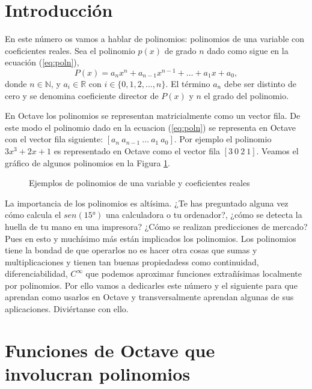 \section*{Introducción}
En este número os vamos a hablar de polinomios: polinomios de una variable con coeficientes reales. Sea el polinomio $p(x)$ de grado $n$ dado como sigue en la ecuación (\ref{eq:poln}),
\begin{equation}\label{eq:poln}
P(x)=a_n x^n + a_{n-1}x^{n-1}+\dots+a_{1}x+a_{0},
\end{equation}
donde $n\in \mathbb{N}$, y $a_i\in\mathbb{R}$ con $i\in \{0,1,2,...,n\}$. El término $a_n$ debe ser distinto de cero y se denomina coeficiente director de $P(x)$ y $n$ el grado del polinomio.

En Octave los polinomios se representan  matricialmente como un vector fila. De este modo el polinomio dado en la ecuacion (\ref{eq:poln}) se representa en Octave con el vector fila siguiente: $[a_n\: a_{n-1}\: \dots \:a_1 \:a_0]$. Por ejemplo el polinomio $3x^3+2x+1$ es representado en Octave como el vector fila $[3\: 0\: 2\: 1]$. Veamos el gráfico de algunos polinomios en la Figura \ref{fig:polis}.
\begin{figure}[ht!]
  \centering
  \begin{figurebox}
  \centering
    \scalebox{0.7}{}
  \caption{Ejemplos de polinomios de una variable y coeficientes reales}
  \label{fig:polis}
  \end{figurebox}
\end{figure}
 
La importancia de los polinomios es altísima. ¿Te has preguntado alguna vez cómo calcula el $sen(15°)$ una calculadora o tu ordenador?, ¿cómo se detecta la huella de tu mano en una impresora? ¿Cómo se realizan predicciones de mercado? Pues en esto y muchísimo más están implicados los polinomios. Los polinomios tiene la bondad de que operarlos no es hacer otra cosas que sumas y multiplicaciones y tienen tan buenas propiedadess como continuidad, diferenciabilidad, $C^\infty$ que podemos aproximar funciones extrañísimas localmente por polinomios. Por ello vamos a dedicarles este número y el siguiente para que aprendan como usarlos en Octave y transversalmente aprendan algunas de sus aplicaciones. Diviértanse con ello. 

\section{Funciones de Octave que involucran polinomios}

